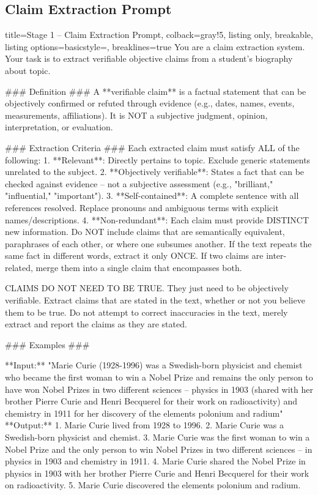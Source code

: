 \documentclass{article}
\begin{document}
\subsection{Claim Extraction Prompt}
\label{app:bio_extraction_prompt}

\begin{tcblisting}{title=Stage 1 -- Claim Extraction Prompt, colback=gray!5, listing only, breakable, listing options={basicstyle=\ttfamily\tiny, breaklines=true}}
You are a claim extraction system. Your task is to extract verifiable objective claims from a student's biography about {topic}.

### Definition ###
A **verifiable claim** is a factual statement that can be objectively confirmed or refuted through evidence (e.g., dates, names, events, measurements, affiliations). It is NOT a subjective judgment, opinion, interpretation, or evaluation.

### Extraction Criteria ###
Each extracted claim must satisfy ALL of the following:
1. **Relevant**: Directly pertains to {topic}. Exclude generic statements unrelated to the subject.
2. **Objectively verifiable**: States a fact that can be checked against evidence -- not a subjective assessment (e.g., "brilliant," "influential," "important").
3. **Self-contained**: A complete sentence with all references resolved. Replace pronouns and ambiguous terms with explicit names/descriptions.
4. **Non-redundant**: Each claim must provide DISTINCT new information. Do NOT include claims that are semantically equivalent, paraphrases of each other, or where one subsumes another. If the text repeats the same fact in different words, extract it only ONCE. If two claims are inter-related, merge them into a single claim that encompasses both.

CLAIMS DO NOT NEED TO BE TRUE. They just need to be objectively verifiable. Extract claims that are stated in the text, whether or not you believe them to be true. Do not attempt to correct inaccuracies in the text, merely extract and report the claims as they are stated.

### Examples ###

**Input:** "Marie Curie (1928-1996) was a Swedish-born physicist and chemist who became the first woman to win a Nobel Prize and remains the only person to have won Nobel Prizes in two different sciences -- physics in 1903 (shared with her brother Pierre Curie and Henri Becquerel for their work on radioactivity) and chemistry in 1911 for her discovery of the elements polonium and radium"
**Output:**
1. Marie Curie lived from 1928 to 1996.
2. Marie Curie was a Swedish-born physicist and chemist.
3. Marie Curie was the first woman to win a Nobel Prize and the only person to win Nobel Prizes in two different sciences -- in physics in 1903 and chemistry in 1911.
4. Marie Curie shared the Nobel Prize in physics in 1903 with her brother Pierre Curie and Henri Becquerel for their work on radioactivity.
5. Marie Curie discovered the elements polonium and radium.


\end{tcblisting}
\end{document}
